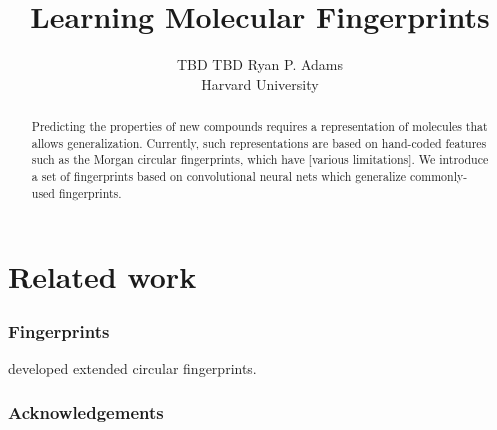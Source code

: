 \documentclass{article}
\title{Learning Molecular Fingerprints}
\author{
TBD
\And
TBD
\And
Ryan P. Adams\\
Harvard University
\And
}
\begin{document}
\maketitle

\begin{abstract}
Predicting the properties of new compounds requires a representation of molecules that allows generalization.
Currently, such representations are based on hand-coded features such as the Morgan circular fingerprints, which have [various limitations].
We introduce a set of fingerprints based on convolutional neural nets which generalize commonly-used fingerprints.
\end{abstract}



\section{Related work}

\subsubsection{Fingerprints}

\citet{ECFP} developed extended circular fingerprints.


\subsubsection*{Acknowledgements}



\end{document}
